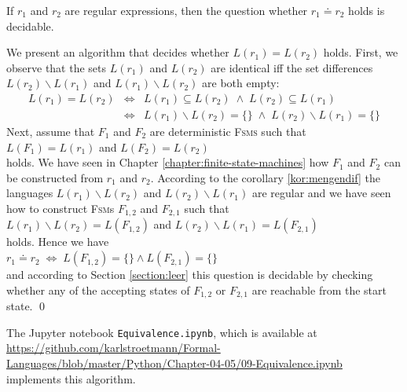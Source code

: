 \begin{Theorem}
  If $r_1$ and $r_2$ are regular expressions, then the question whether $r_1 \doteq r_2$ holds is decidable.
\end{Theorem}

\proofEng
We present an algorithm that decides whether $L(r_1) = L(r_2)$ holds.  First, we observe that the sets
$L(r_1)$ and $L(r_2)$ are identical iff the set differences $L(r_2) \backslash L(r_1)$ and $L(r_1) \backslash L(r_2)$
are both empty:
\begin{eqnarray*}
                  L(r_1) = L(r_2) 
&\Leftrightarrow& L(r_1) \subseteq L(r_2)         \;\wedge\; L(r_2) \subseteq L(r_1)          \\
&\Leftrightarrow& L(r_1) \backslash L(r_2) = \{\} \;\wedge\; L(r_2) \backslash L(r_1) = \{\}  
\end{eqnarray*}
Next, assume that $F_1$ and $F_2$ are deterministic \textsc{Fsms} such that
\\[0.2cm]
\hspace*{1.3cm}
$L(F_1) = L(r_1)$ \quad and \quad $L(F_2) = L(r_2)$
\\[0.2cm]
holds.  We have seen in Chapter \ref{chapter:finite-state-machines} how $F_1$ and $F_2$ can be
constructed from $r_1$ and $r_2$. According to the corollary \ref{kor:mengendif} the languages
$L(r_1) \backslash L(r_2)$ and $L(r_2) \backslash L(r_1)$ are regular and we have seen how to
construct \textsc{Fsm}s $F_{1,2}$ and $F_{2,1}$ such that
\\[0.2cm]
\hspace*{1.3cm}
$L(r_1) \backslash L(r_2) = L(F_{1,2})$ \quad and \quad $L(r_2) \backslash L(r_1) = L(F_{2,1})$ 
\\[0.2cm]
holds.  Hence we have
\\[0.2cm]
\hspace*{1.3cm}
$r_1 \doteq r_2 \;\Leftrightarrow\; L(F_{1,2}) = \{\} \wedge  L(F_{2,1}) = \{\}$
\\[0.2cm]
and according to Section \ref{section:leer} this question is decidable by checking whether any of
the accepting states of $F_{1,2}$ or $F_{2,1}$ are reachable from the start state.
\qed

\remarkEng
The Jupyter notebook \texttt{Equivalence.ipynb}, which is available at
\\[0.2cm]
\hspace*{0.3cm}
\href{https://github.com/karlstroetmann/Formal-Languages/blob/master/Python/Chapter-04-05/09-Equivalence.ipynb}{https://github.com/karlstroetmann/Formal-Languages/blob/master/Python/Chapter-04-05/09-Equivalence.ipynb}
\\[0.2cm]
implements this algorithm.

